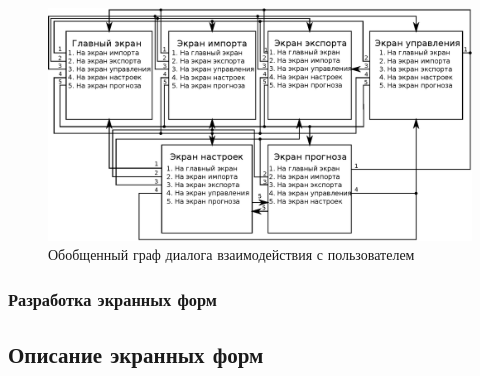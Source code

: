 \clearpage
\begin{figure}[h!]
\centering
\includegraphics[angle=90,origin=c]{technology/dialog_generic}
\caption{Обобщенный граф диалога взаимодействия с пользователем}
\label{figure:dialog_generic}
\end{figure}

\subsubsection{Разработка экранных форм}



\subsection{Описание экранных форм}